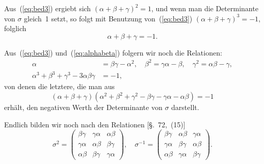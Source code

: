 \documentclass[12pt,a4paper]{article}
\begin{document}
Aus~(\ref{eq:bed3}) ergiebt sich $(\alpha + \beta + \gamma)^2 = 1$, und wenn man die Determinante von $\sigma$ gleich~1 setzt, so folgt mit Benutzung von~(\ref{eq:bed3})
$(\alpha + \beta + \gamma)^3 = -1$, folglich
\begin{equation}
\label{eq:alphabeta} \alpha + \beta + \gamma = -1.
\end{equation}

Aus~(\ref{eq:bed3}) und~(\ref{eq:alphabeta}) folgern wir noch die Relationen:
\begin{align}
\label{eq:rel1} \alpha &= \beta\gamma - \alpha^2, \quad \beta^2 = \gamma\alpha - \beta, \quad \gamma^2 = \alpha\beta - \gamma,\\
\label{eq:rel2} \alpha^3 + \beta^3 + \gamma^3 - 3\alpha\beta\gamma &= -1,
\end{align}
von denen die letztere, die man aus
\[ (\alpha + \beta + \gamma)(\alpha^2 + \beta^2 + \gamma^2 - \beta\gamma - \gamma\alpha - \alpha\beta) = -1 \]
erh\"alt, den negativen Werth der Determinante von $\sigma$ darstellt.

Endlich bilden wir noch nach den Relationen [\S.~72,~(15)]
\begin{equation}
\label{eq:sigma2} \sigma^2 = \begin{pmatrix} \beta\gamma & \gamma\alpha & \alpha\beta \\ \gamma\alpha & \alpha\beta & \beta\gamma \\ \alpha\beta & \beta\gamma & \gamma\alpha \end{pmatrix}, \quad \sigma^{-1} = \begin{pmatrix} \beta\gamma & \alpha\beta & \gamma\alpha \\ \gamma\alpha & \beta\gamma & \alpha\beta \\ \alpha\beta & \gamma\alpha & \beta\gamma \end{pmatrix}.
\end{equation}
\end{document}
